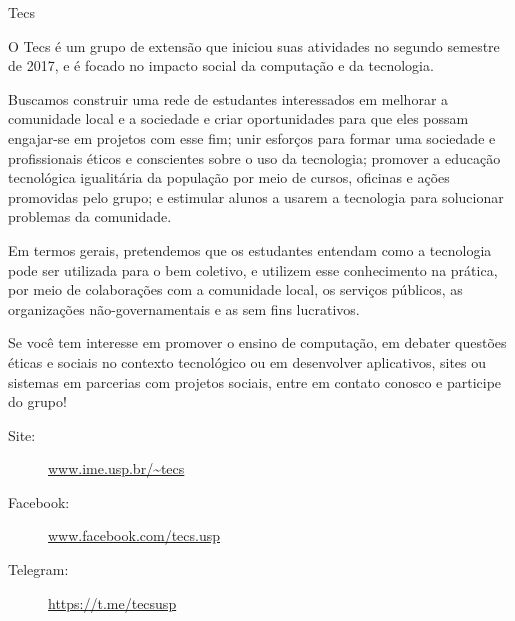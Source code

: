 
\begin{subsecao}{Tecs}


O Tecs é um grupo de extensão que iniciou suas atividades no segundo semestre de
2017, e é focado no impacto social da computação e da tecnologia. 

Buscamos construir uma rede de estudantes interessados em melhorar a comunidade
local e a sociedade e criar oportunidades para que eles possam engajar-se em
projetos com esse fim; unir esforços para formar uma sociedade e profissionais
éticos e conscientes sobre o uso da tecnologia; promover a educação tecnológica
igualitária da população por meio de cursos, oficinas e ações promovidas pelo
grupo; e estimular alunos a usarem a tecnologia para solucionar problemas da
comunidade. 

Em termos gerais, pretendemos que os estudantes entendam como a tecnologia pode
ser utilizada para o bem coletivo, e utilizem esse conhecimento na prática, por
meio de colaborações com a comunidade local, os serviços públicos, as
organizações não-governamentais e as sem fins lucrativos. 

Se você tem interesse em promover o ensino de computação, em debater questões
éticas e sociais no contexto tecnológico ou em desenvolver aplicativos, sites ou
sistemas em parcerias com projetos sociais, entre em contato conosco e participe
do grupo!

\begin{description}
  \item[Site:] \url{www.ime.usp.br/~tecs}
  \item[Facebook:] \url{www.facebook.com/tecs.usp}
  \item[Telegram:] \url{https://t.me/tecsusp}
\end{description}

\end{subsecao}
